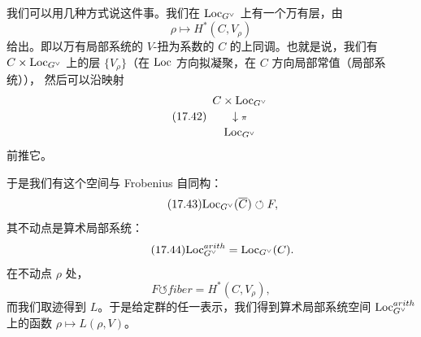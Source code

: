 我们可以用几种方式说这件事。我们在 $\mathrm{Loc}_{G^{\vee}}$ 上有一个万有层，由
\begin{equation}\tag{17.41}\label{eq:17.41}
\rho\mapsto H^*(C,V_{\rho})
\end{equation}
给出。即以万有局部系统的 $V$-扭为系数的 $C$ 的上同调。也就是说，我们有 $C\times\mathrm{Loc}_{G^{\vee}}$
上的层 $\{V_{\rho}\}$（在 $\mathrm{Loc}$ 方向拟凝聚，在 $C$ 方向局部常值（局部系统）），
然后可以沿映射
\begin{equation}\tag{17.42}\label{eq:17.42}
\begin{array}{c}
C\times\mathrm{Loc}_{G^{\vee}}\\[2pt]
\downarrow{\scriptstyle \pi}\\[2pt]
\mathrm{Loc}_{G^{\vee}}
\end{array}
\end{equation}
前推它。

于是我们有这个空间与 Frobenius 自同构：
\begin{equation}\tag{17.43}\label{eq:17.43}
\mathrm{Loc}_{G^{\vee}}(\overline C)\circlearrowleft F,
\end{equation}
其不动点是算术局部系统：
\begin{equation}\tag{17.44}\label{eq:17.44}
\mathrm{Loc}^{arith}_{G^{\vee}}=\mathrm{Loc}_{G^{\vee}}(C).
\end{equation}
在不动点 $\rho$ 处，
\begin{equation}\tag{17.45}\label{eq:17.45}
F\circlearrowleft fiber=H^*(C,V_{\rho}),
\end{equation}
而我们取迹得到 $L$。于是给定群的任一表示，我们得到算术局部系统空间
$\mathrm{Loc}^{arith}_{G^{\vee}}$ 上的函数 $\rho\mapsto L(\rho,V)$。

